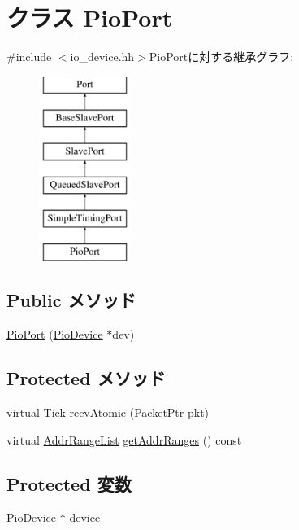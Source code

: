 \hypertarget{classPioPort}{
\section{クラス PioPort}
\label{classPioPort}
}


{\ttfamily \#include $<$io\_\-device.hh$>$}PioPortに対する継承グラフ:\begin{figure}[H]
\begin{center}
\leavevmode
\includegraphics[height=6cm]{classPioPort}
\end{center}
\end{figure}
\subsection*{Public メソッド}
\begin{DoxyCompactItemize}
\item 
\hyperlink{classPioPort_ab40b803a96f5bdefcb721a5baafe34f5}{PioPort} (\hyperlink{classPioDevice}{PioDevice} $\ast$dev)
\end{DoxyCompactItemize}
\subsection*{Protected メソッド}
\begin{DoxyCompactItemize}
\item 
virtual \hyperlink{base_2types_8hh_a5c8ed81b7d238c9083e1037ba6d61643}{Tick} \hyperlink{classPioPort_a5f0b4c4a94f6b0053f9d7a4eb9c2518a}{recvAtomic} (\hyperlink{classPacket}{PacketPtr} pkt)
\item 
virtual \hyperlink{classstd_1_1list}{AddrRangeList} \hyperlink{classPioPort_a36cf113d5e5e091ebddb32306c098fae}{getAddrRanges} () const 
\end{DoxyCompactItemize}
\subsection*{Protected 変数}
\begin{DoxyCompactItemize}
\item 
\hyperlink{classPioDevice}{PioDevice} $\ast$ \hyperlink{classPioPort_a3560f59726d0dbf34b5993ee6c685143}{device}
\end{DoxyCompactItemize}



